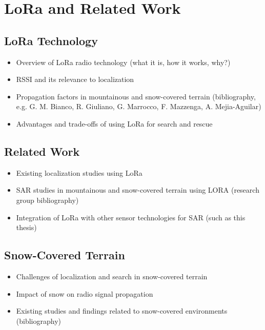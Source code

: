 \chapter{LoRa and Related Work}

\section{LoRa Technology}
\begin{itemize}
\item Overview of LoRa radio technology (what it is, how it works, why?)
\item RSSI and its relevance to localization
\item Propagation factors in mountainous and snow-covered terrain (bibliography, e.g. G. M. Bianco, R. Giuliano, G. Marrocco, F. Mazzenga, A. Mejia-Aguilar)
\item Advantages and trade-offs of using LoRa for search and rescue
\end{itemize}
\section{Related Work}
\begin{itemize}
\item Existing localization studies using LoRa
\item SAR studies in mountainous and snow-covered terrain using LORA (research group bibliography)
\item Integration of LoRa with other sensor technologies for SAR (such as this thesis)
\end{itemize}
\section{Snow-Covered Terrain}
\begin{itemize}
\item Challenges of localization and search in snow-covered terrain
\item Impact of snow on radio signal propagation
\item Existing studies and findings related to snow-covered environments (bibliography)
\end{itemize}